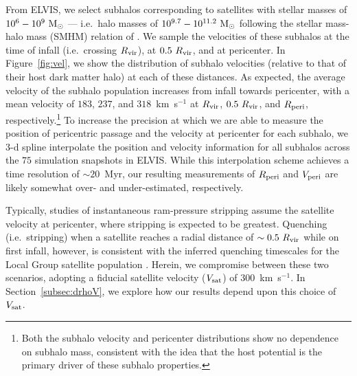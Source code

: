 From ELVIS, we select subhalos corresponding to satellites with
stellar masses of $10^{6}-10^{9}~{\rm M}_{\odot}$ --- i.e.~halo masses of
$10^{9.7}-10^{11.2}~{\rm M}_{\odot}$ following the stellar mass-halo mass (SMHM)
relation of \citet{gk14}. 
%
We sample the velocities of these subhalos at the time of infall
(i.e.~crossing $R_{\rm vir}$), at $0.5~R_{\rm vir}$, and at
pericenter. In Figure~\ref{fig:vel}, we show the distribution of
subhalo velocities (relative to that of their host dark matter halo)
at each of these distances. 
%
As expected, the average velocity of the subhalo population increases
from infall towards pericenter, with a mean velocity of $183$, $237$,
and $318$~km~s$^{-1}$ at $R_{\rm vir}$, $0.5~R_{\rm vir}$, and $R_{\rm
  peri}$, respectively.\footnote{Both the subhalo velocity and
  pericenter distributions show no dependence on subhalo mass,
  consistent with the idea that the host potential is the primary
  driver of these subhalo properties.}
%
To increase the precision at which we are able to measure the position
of pericentric passage and the velocity at pericenter for each subhalo,
we 3-d spline interpolate the position and velocity information for
all subhalos across the $75$ simulation snapshots in ELVIS.
%
While this interpolation scheme achieves a time resolution of
$\sim20$~Myr, our resulting measurements of $R_{\rm peri}$ and $V_{\rm
  peri}$ are likely somewhat over- and under-estimated, respectively.
%


Typically, studies of instantaneous ram-pressure stripping assume the
satellite velocity at pericenter, where stripping is expected to be
greatest.
%
Quenching (i.e.~stripping) when a satellite reaches a radial distance
of $\sim0.5~R_{\rm vir}$ while on first infall, however, is consistent
with the inferred quenching timescales for the Local Group satellite
population \citep{fham15}. 
Herein, we compromise between these two scenarios, adopting a fiducial
satellite velocity ($V_{\rm sat}$) of $300$~km~s$^{-1}$. In
Section~\ref{subsec:drhoV}, we explore how our results depend upon
this choice of $V_{\rm sat}$.




